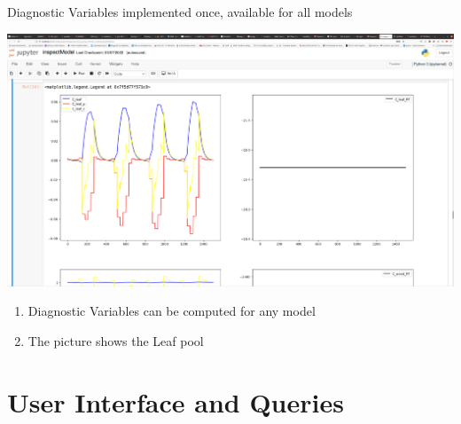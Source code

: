 \documentclass[96pt]{article}
\begin{document}
\begin{tcbposter}
{\begin{multicols*}{4}
\begin{mybox}{Diagnostic Variables implemented once, available for all models}
\end{mybox}
	\includegraphics[width=\columnwidth]{TracebilityAnalysis.png}
	\begin{enumerate}
	\item 
	Diagnostic Variables can be computed for any model  
	\item The picture shows the Leaf pool
	\end{enumerate}

\section{User Interface and Queries}

\end{multicols*}}
\end{tcbposter}
\end{document}
